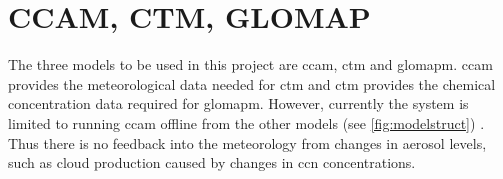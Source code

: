 







	\section{CCAM, CTM, GLOMAP}
	\label{sec:ccg}

	The three models to be used in this project are \gls{ccam}, \gls{ctm} and \gls{glomapm}. \gls{ccam} provides the meteorological data needed for \gls{ctm} and \gls{ctm} provides the chemical concentration data required for \gls{glomapm}. However, currently the system is limited to running \gls{ccam} offline from the other models (see \cref{fig:modelstruct}) \citep{mcgregor2008updated}. Thus there is no feedback into the meteorology from changes in aerosol levels, such as cloud production caused by changes in \gls{ccn} concentrations.

